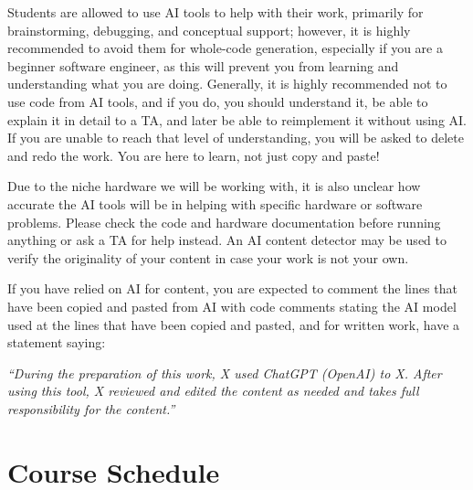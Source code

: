 \documentclass[11pt]{article}
\begin{document}
Students are allowed to use AI tools to help with their work, primarily for brainstorming, debugging, and conceptual support; however, it is highly recommended to avoid them for whole-code generation, especially if you are a beginner software engineer, as this will prevent you from learning and understanding what you are doing. Generally, it is highly recommended not to use code from AI tools, and if you do, you should understand it, be able to explain it in detail to a TA, and later be able to reimplement it without using AI. If you are unable to reach that level of understanding, you will be asked to delete and redo the work. You are here to learn, not just copy and paste!
\par
Due to the niche hardware we will be working with, it is also unclear how accurate the AI tools will be in helping with specific hardware or software problems. Please check the code and hardware documentation before running anything or ask a TA for help instead.
An AI content detector may be used to verify the originality of your content in case your work is not your own.
\par
If you have relied on AI for content, you are expected to comment the lines that have been copied and pasted from AI with code comments stating the AI model used at the lines that have been copied and pasted, and for written work, have a statement saying:
\par
\textit{``During the preparation of this work, X used ChatGPT (OpenAI) to X. After using this tool, X reviewed and edited the content as needed and takes full responsibility for the content.”}

\section*{Course Schedule}
\end{document}
